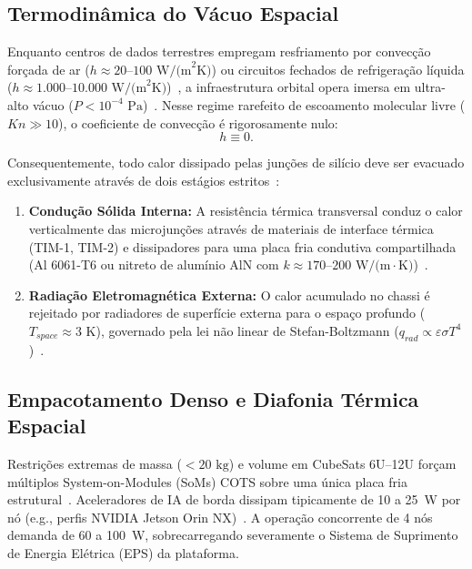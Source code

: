 \documentclass[journal]{IEEEtran}
\begin{document}
\subsection{Termodinâmica do Vácuo Espacial}
Enquanto centros de dados terrestres empregam resfriamento por convecção forçada de ar ($h \approx 20\text{--}100\text{ W/(m}^2\text{K)}$) ou circuitos fechados de refrigeração líquida ($h \approx 1.000\text{--}10.000\text{ W/(m}^2\text{K)}$)~\cite{incropera2011fundamentals}, a infraestrutura orbital opera imersa em ultra-alto vácuo ($P < 10^{-4}\text{ Pa}$)~\cite{nasa2022handbook, gilmore2002handbook}. Nesse regime rarefeito de escoamento molecular livre ($Kn \gg 10$), o coeficiente de convecção é rigorosamente nulo:
\begin{equation}
h \equiv 0.
\end{equation}

Consequentemente, todo calor dissipado pelas junções de silício deve ser evacuado exclusivamente através de dois estágios estritos~\cite{ecss2008thermal, gilmore2002handbook}:
\begin{enumerate}
    \item \textbf{Condução Sólida Interna:} A resistência térmica transversal conduz o calor verticalmente das microjunções através de materiais de interface térmica (TIM-1, TIM-2) e dissipadores para uma placa fria condutiva compartilhada (Al 6061-T6 ou nitreto de alumínio AlN com $k \approx 170\text{--}200\text{ W/(m}\cdot\text{K)}$)~\cite{nasa2022handbook, ecss2008thermal}.
    \item \textbf{Radiação Eletromagnética Externa:} O calor acumulado no chassi é rejeitado por radiadores de superfície externa para o espaço profundo ($T_{space} \approx 3\text{ K}$), governado pela lei não linear de Stefan-Boltzmann ($q_{rad} \propto \varepsilon \sigma T^4$)~\cite{incropera2011fundamentals, pederson2024radiator}.
\end{enumerate}

\subsection{Empacotamento Denso e Diafonia Térmica Espacial}
Restrições extremas de massa ($< 20\text{ kg}$) e volume em CubeSats 6U--12U forçam múltiplos System-on-Modules (SoMs) COTS sobre uma única placa fria estrutural~\cite{nasa2022handbook}. Aceleradores de IA de borda dissipam tipicamente de 10 a 25~W por nó (e.g., perfis NVIDIA Jetson Orin NX)~\cite{ortiz2024spirit}. A operação concorrente de 4 nós demanda de 60 a 100~W, sobrecarregando severamente o Sistema de Suprimento de Energia Elétrica (EPS) da plataforma.
\end{document}
